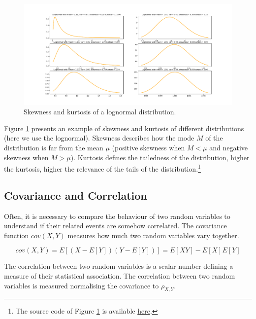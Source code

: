 \begin{figure}[hbt!]
\centering
\includegraphics[width=1\textwidth]{SectionLetsMath/elemStat_figures/fig_skewnessKurtosis.png}
\captionsetup{type=figure}
\caption{Skewness and kurtosis of a lognormal distribution.}
\label{fig_skewnessKurtosis}
\end{figure}

Figure \ref{fig_skewnessKurtosis} presents an example of skewness and kurtosis of different distributions (here we use the lognormal). Skewness describes how the mode $M$ of the distribution is far from the mean $\mu$ (positive skewness when $M<\mu$ and negative skewness when $M>\mu$). Kurtosis defines the tailedness of the distribution, higher the kurtosis, higher the relevance of the tails of the distribution.\footnote{The source code of Figure \ref{fig_skewnessKurtosis} is available \href{https://github.com/aletuf93/logproj/blob/master/examples/01_elemStat/01.\%20Probability\%20Theory.ipynb}{here}.
}

\subsection{Covariance and Correlation} \label{secCovarianceCorrelation}
Often, it is necessary to compare the behaviour of two random variables to understand if their related events are somehow correlated. The covariance function $cov(X,Y)$ measures how much two random variables vary together.

\begin{equation}
cov\left(X,Y\right)=E\left[\left(X-E\left[Y\right]\right)\left(Y-E\left[Y\right]\right)\right]=E\left[XY\right]-E[X]E[Y]
\label{eq_covariance}
\end{equation}

The correlation between two random variables is a scalar number defining a measure of their statistical association. The correlation between two random variables is measured normalising the covariance to $\rho_{X,Y}$.

